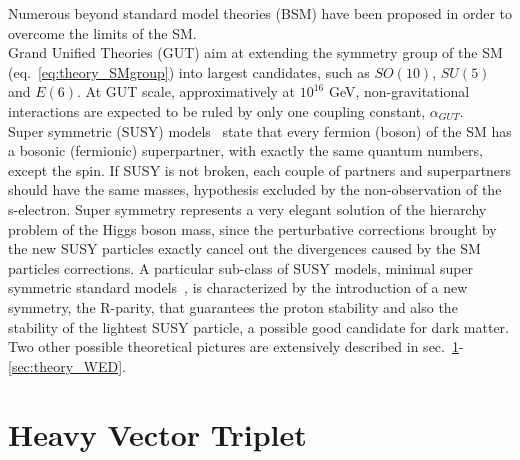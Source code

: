 \noindent Numerous beyond standard model theories (BSM) have been proposed in order to overcome the limits of the SM.\\
Grand Unified Theories (GUT) aim at extending the symmetry group of the SM (eq.~\ref{eq:theory_SMgroup}) into largest candidates, such as $SO(10)$, $SU(5)$ and $E(6)$. At GUT scale, approximatively at $10^{16}$ GeV, non-gravitational interactions are expected to be ruled by only one coupling constant, $\alpha_{GUT}$.\\%
Super symmetric (SUSY) models~\cite{Martin:1997ns} state that every fermion (boson) of the SM has a bosonic (fermionic) superpartner, with exactly the same quantum numbers, except the spin. If SUSY is not broken, each couple of partners and superpartners should have the same masses, hypothesis excluded by the non-observation of the s-electron. Super symmetry represents a very elegant solution of the hierarchy problem of the Higgs boson mass, since the perturbative corrections brought by the new SUSY particles exactly cancel out the divergences caused by the SM particles corrections. A particular sub-class of SUSY models, minimal super symmetric standard models~\cite{Csaki:1996ks,Castano:1993ri,Haber:1993wf}, is characterized by the introduction of a new symmetry, the R-parity, that guarantees the proton stability and also the stability of the lightest SUSY particle, a possible good candidate for dark matter.
\\

\noindent Two other possible theoretical pictures are extensively described in sec.~\ref{sec:theory_HVT}-\ref{sec:theory_WED}.

\newpage

\section{Heavy Vector Triplet}
\label{sec:theory_HVT}

